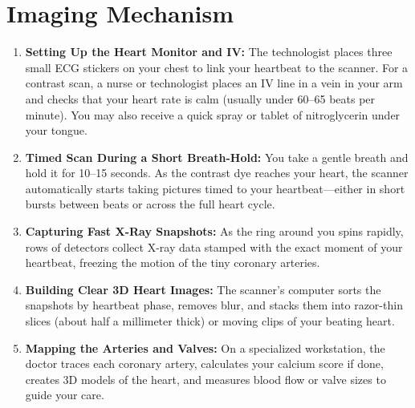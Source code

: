 \section{Imaging Mechanism}
\begin{enumerate}
    \item \textbf{Setting Up the Heart Monitor and IV:} The technologist places three small ECG stickers on your chest to link your heartbeat to the scanner. For a contrast scan, a nurse or technologist places an IV line in a vein in your arm and checks that your heart rate is calm (usually under 60--65 beats per minute). You may also receive a quick spray or tablet of nitroglycerin under your tongue.
    \item \textbf{Timed Scan During a Short Breath-Hold:} You take a gentle breath and hold it for 10--15 seconds. As the contrast dye reaches your heart, the scanner automatically starts taking pictures timed to your heartbeat---either in short bursts between beats or across the full heart cycle.
    \item \textbf{Capturing Fast X-Ray Snapshots:} As the ring around you spins rapidly, rows of detectors collect X-ray data stamped with the exact moment of your heartbeat, freezing the motion of the tiny coronary arteries.
    \item \textbf{Building Clear 3D Heart Images:} The scanner's computer sorts the snapshots by heartbeat phase, removes blur, and stacks them into razor-thin slices (about half a millimeter thick) or moving clips of your beating heart.
    \item \textbf{Mapping the Arteries and Valves:} On a specialized workstation, the doctor traces each coronary artery, calculates your calcium score if done, creates 3D models of the heart, and measures blood flow or valve sizes to guide your care.
\end{enumerate}

